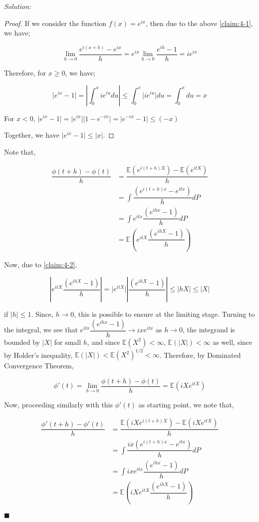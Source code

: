 \documentclass[12pt]{article}
\newcommand{\E}{\mathbb{E}}
\theoremstyle{definition}
\newenvironment{answer}{\textit{Solution: }\quad }{ \hfill $\blacksquare$}
\begin{document}
\begin{answer}
	\begin{proof}
		If we consider the function $f(x) = e^{ix}$, then due to the above \cref{claim:4-1}, we have;

		$$\lim_{h \rightarrow 0} \dfrac{e^{i(x+h)} - e^{ix}}{h} = e^{ix} \lim_{h \rightarrow 0} \dfrac{e^{ih} - 1}{h} = ie^{ix}$$

		Therefore, for $x \geq 0$, we have;

		$$
		\vert e^{ix} - 1 \vert
		= \left\vert \int_{0}^{x} ie^{iu} du \right\vert
		\leq \int_{0}^{x} \vert ie^{iu} \vert du
		= \int_{0}^{x} du = x
		$$

		For $x < 0$, $\vert e^{ix} - 1 \vert = \vert e^{ix} \vert \vert 1 - e^{-ix} \vert = \vert e^{-ix} - 1 \vert \leq (-x)$

		Together, we have $\vert e^{ix} - 1 \vert \leq \vert x \vert$.
	\end{proof}
	
	Note that,

	\begin{align*}
		\dfrac{\phi(t+h) - \phi(t)}{h}
		& = \dfrac{\E(e^{i(t+h)X}) - \E(e^{itX})}{h}\\
		& = \int \dfrac{(e^{i(t+h)x} - e^{itx})}{h} dP\\
		& = \int e^{itx}\dfrac{(e^{ihx} - 1)}{h} dP\\
		& = \E \left( e^{itX}\dfrac{(e^{ihX} - 1)}{h} \right)
	\end{align*}

	Now, due to \cref{claim:4-2}, 

	$$
	\left\vert e^{itX}\dfrac{(e^{ihX} - 1)}{h} \right\vert 
	= \vert e^{itX} \vert \left\vert \dfrac{(e^{ihX} - 1)}{h} \right\vert
	\leq \vert hX \vert
	\leq \vert X \vert
	$$

	if $\vert h \vert \leq 1$. Since, $h \rightarrow 0$, this is possible to ensure at the limiting stage. Turning to the integral, we see that $e^{itx}\dfrac{(e^{ihx} - 1)}{h} \rightarrow ixe^{itx}$ as $h \rightarrow 0$, the integrand is bounded by $\vert X \vert$ for small $h$, and since $\E(X^2) < \infty$, $\E(\vert X \vert) < \infty$ as well, since by Holder's inequality, $\E(\vert X\vert) < \E(X^2)^{1/2} < \infty$. Therefore, by Dominated Convergence Theorem, 

	$$
	\phi'(t) = \lim_{h \rightarrow 0}\dfrac{\phi(t+h) - \phi(t)}{h}
	= \E(iX e^{itX}) 
	$$

	Now, proceeding similarly with this $\phi'(t)$ as starting point, we note that,

	\begin{align*}
		\dfrac{\phi'(t+h) - \phi'(t)}{h}
		& = \dfrac{\E(iXe^{i(t+h)X}) - \E(iXe^{itX})}{h}\\
		& = \int \dfrac{ix(e^{i(t+h)x} - e^{itx})}{h} dP\\
		& = \int ixe^{itx}\dfrac{(e^{ihx} - 1)}{h} dP\\
		& = \E \left( iX e^{itX}\dfrac{(e^{ihX} - 1)}{h} \right)
	\end{align*}


\end{answer}
\end{document}
